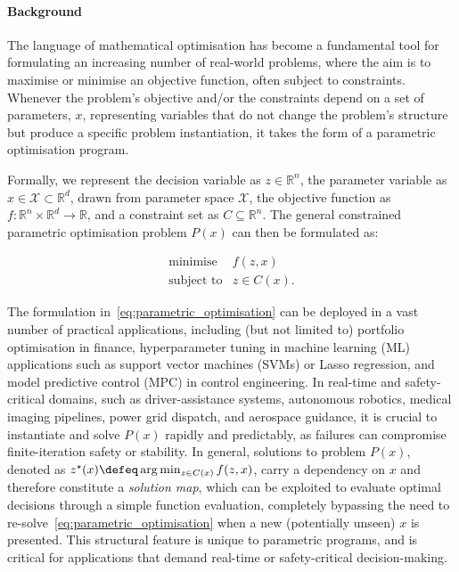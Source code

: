\paragraph{Background}
The language of mathematical optimisation has become a fundamental tool for formulating an increasing number of real-world problems, where the aim is to maximise or minimise an objective function, often subject to constraints. Whenever the problem's objective and/or the constraints depend on a set of parameters, $x$, representing variables that do not change the problem's structure but produce a specific problem instantiation, it takes the form of a parametric optimisation program. 

Formally, we represent the decision variable as $z \in \mathbb{R}^n$, the parameter variable as $x \in \mathcal{X} \subset \mathbb{R}^d$, drawn from parameter space $\mathcal{X}$, the objective function as $f : \mathbb{R}^n\times\mathbb{R}^d \rightarrow \mathbb{R}$, and a constraint set as $C \subseteq \mathbb{R}^n$. The general constrained parametric optimisation problem $P(x)$ can then be formulated as:

\begin{equation} \label{eq:parametric_optimisation}
\begin{array}{ll}
    \text{minimise}  & f(z,x) \\
    \text{subject to} & z \in C(x).
\end{array}
\end{equation}

The formulation in~\eqref{eq:parametric_optimisation} can be deployed in a vast number of practical applications, including (but not limited to) portfolio optimisation in finance, hyperparameter tuning in machine learning (ML) applications such as support vector machines (SVMs) or Lasso regression, and model predictive control (MPC) in control engineering. In real-time and safety-critical domains, such as driver-assistance systems, autonomous robotics, medical imaging pipelines, power grid dispatch, and aerospace guidance, it is crucial to instantiate and solve $P(x)$ rapidly and predictably, as failures can compromise finite-iteration safety or stability. In general, solutions to problem $P(x)$, denoted as $z^\star(x) \defeq \arg\min_{z \in C(x)} f(z,x)$, carry a dependency on $x$ and therefore constitute a \textit{solution map}, which can be exploited to evaluate optimal decisions through a simple function evaluation, completely bypassing the need to re-solve~\eqref{eq:parametric_optimisation} when a new (potentially unseen) $x$ is presented. This structural feature is unique to parametric programs, and is critical for applications that demand real-time or safety-critical decision-making.